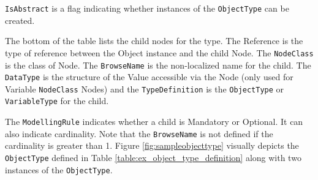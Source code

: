 \texttt{IsAbstract} is a flag indicating whether instances of the \texttt{ObjectType} can be created.

The bottom of the table lists the child nodes for the type. The Reference is the type of reference between the Object instance and the child Node. The \texttt{NodeClass} is the class of Node. The \texttt{BrowseName} is the non-localized name for the child. The \texttt{DataType} is the structure of the Value accessible via the Node (only used for Variable \texttt{NodeClass} Nodes) and the \texttt{TypeDefinition} is the \texttt{ObjectType} or \texttt{VariableType} for the child. 

The \texttt{ModellingRule} indicates whether a child is Mandatory or Optional. It can also indicate cardinality. Note that the \texttt{BrowseName} is not defined if the cardinality is greater than 1. Figure \ref{fig:sampleobjecttype} visually depicts the \texttt{ObjectType} defined in Table \ref{table:ex_object_type_definition} along with two instances of the \texttt{ObjectType}.


\FloatBarrier
